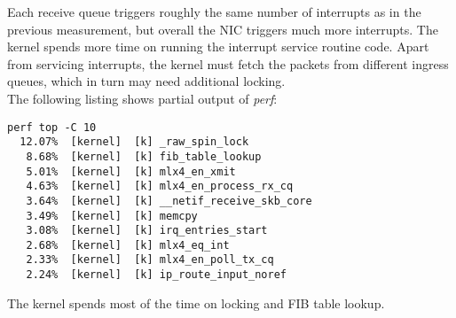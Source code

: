 Each receive queue triggers roughly the same number of interrupts as in the previous measurement,
but overall the NIC triggers much more interrupts.
The kernel spends more time on running the interrupt service routine code.
Apart from servicing interrupts, the kernel must fetch the packets from different ingress queues,
which in turn may need additional locking.
\\
The following listing shows partial output of {\it{perf}}:
\begin{lstlisting}
perf top -C 10
  12.07%  [kernel]  [k] _raw_spin_lock
   8.68%  [kernel]  [k] fib_table_lookup
   5.01%  [kernel]  [k] mlx4_en_xmit
   4.63%  [kernel]  [k] mlx4_en_process_rx_cq
   3.64%  [kernel]  [k] __netif_receive_skb_core
   3.49%  [kernel]  [k] memcpy
   3.08%  [kernel]  [k] irq_entries_start
   2.68%  [kernel]  [k] mlx4_eq_int
   2.33%  [kernel]  [k] mlx4_en_poll_tx_cq
   2.24%  [kernel]  [k] ip_route_input_noref
\end{lstlisting}
The kernel spends most of the time on locking and FIB table lookup.
